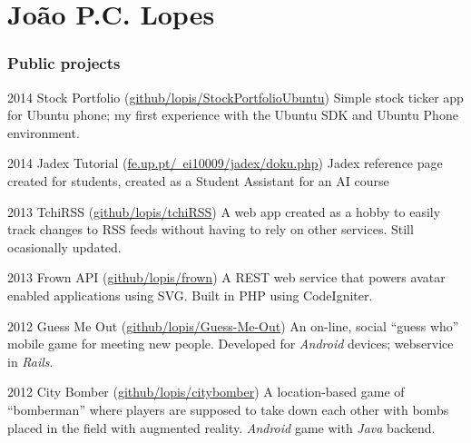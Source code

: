 \documentclass{tccv}
\begin{document}
\part{João P.C. Lopes}

\section{Public projects}

\begin{yearlist}

\item{2014}
    {Stock Portfolio \newline
    (\href{https://github.com/lopis/StockPortfolioUbuntu}{github/lopis/StockPortfolioUbuntu})}
    {Simple stock ticker app for Ubuntu phone; my first experience with the Ubuntu SDK and Ubuntu Phone environment.}

\item{2014}
    {Jadex Tutorial \newline
    (\href{http://paginas.fe.up.pt/~ei10009/jadex/doku.php}{fe.up.pt/~ei10009/jadex/doku.php})}
    {Jadex reference page created for students, created as a Student Assistant for an AI course}

\item{2013}
    {TchiRSS \newline
    (\href{https://github.com/lopis/tchiRSS}{github/lopis/tchiRSS})}
    {A web app created as a hobby to easily track changes to RSS feeds without having to rely on other services. Still ocasionally updated. }

\item{2013}
    {Frown API \newline
    (\href{https://github.com/lopis/frown}{github/lopis/frown})}
    {A REST web service that powers avatar enabled applications using SVG.
    Built in PHP using CodeIgniter.}

\item{2012}
    {Guess Me Out \newline
    (\href{https://github.com/lopis/Guess-Me-Out}{github/lopis/Guess-Me-Out})}
    {An on-line, social ``guess who'' mobile game for meeting new people.
    Developed for \emph{Android} devices; webservice in \emph{Rails}.}

\item{2012}
    {City Bomber \newline
    (\href{https://github.com/lopis/citybomber}{github/lopis/citybomber})}
    {A location-based game of ``bomberman'' where players are supposed
    to take down each other with bombs placed in the field with augmented reality. \emph{Android} game with \emph{Java} backend.}

\end{yearlist}
\end{document}
